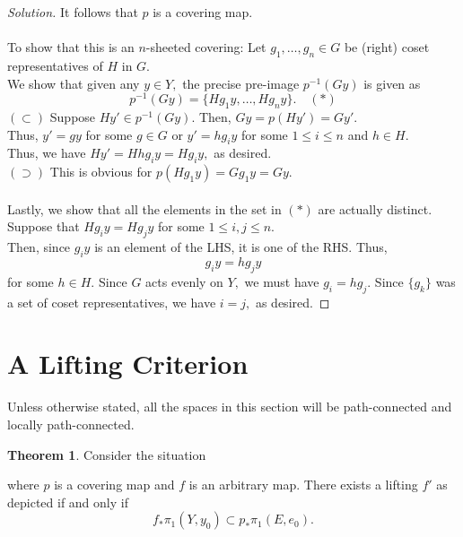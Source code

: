 \documentclass[12pt]{article}
\theoremstyle{definition}
\newtheorem{thm}{Theorem}
\numberwithin{thm}{section}
\newenvironment{soln}{\begin{proof}[Solution]}{\end{proof}}
\begin{document}
\begin{soln}
	It follows that $p$ is a covering map.\\~\\
	To show that this is an $n$-sheeted covering: Let $g_1, \ldots, g_n \in G$ be (right) coset representatives of $H$ in $G.$\\
	We show that given any $y \in Y,$ the precise pre-image $p^{-1}(Gy)$ is given as
	\begin{equation*} 
		p^{-1}(Gy) = \{Hg_1y, \ldots, Hg_ny\}. \quad (*)
	\end{equation*}
	$(\subset)$ Suppose $Hy' \in p^{-1}(Gy).$ Then, $Gy = p(Hy') = Gy'.$\\
	Thus, $y' = gy$ for some $g \in G$ or $y' = hg_iy$ for some $1 \le i \le n$ and $h \in H.$\\
	Thus, we have $Hy' = Hhg_iy = Hg_iy,$ as desired.\\
	$(\supset)$ This is obvious for $p(Hg_1y) = Gg_1y = Gy.$\\~\\
	Lastly, we show that all the elements in the set in $(*)$ are actually distinct. Suppose that $Hg_iy = Hg_jy$ for some $1 \le i, j \le n.$\\
	Then, since $g_iy$ is an element of the LHS, it is one of the RHS. Thus,
	\begin{equation*} 
		g_iy = hg_jy
	\end{equation*}
	for some $h \in H.$ Since $G$ acts evenly on $Y,$ we must have $g_i = hg_j.$ Since $\{g_k\}$ was a set of coset representatives, we have $i = j,$ as desired.
\end{soln}
%
\section{A Lifting Criterion}
Unless otherwise stated, all the spaces in this section will be path-connected and locally path-connected.

\begin{thm} \label{thm:liftcriterion}
	Consider the situation	
	\begin{center}
	\end{center}
	where $p$ is a covering map and $f$ is an arbitrary map. There exists a lifting $f'$ as depicted if and only if 
	\begin{equation*} 
		f_*\pi_1(Y, y_0) \subset p_*\pi_1(E, e_0).
	\end{equation*}
\end{thm}
\end{document}
